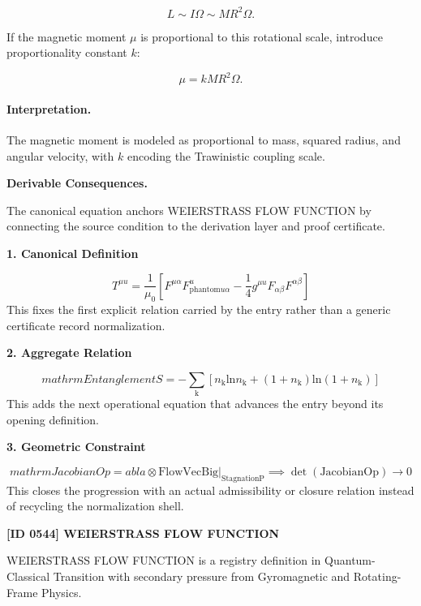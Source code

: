 \begin{equation}
L
\sim
I\Omega
\sim
MR^2\Omega .
\end{equation}

If the magnetic moment $\mu$ is proportional to this rotational scale, introduce proportionality constant $k$:

\begin{equation}
\boxed{
\mu
=
kMR^2\Omega .
}
\end{equation}

\paragraph{Interpretation.}
The magnetic moment is modeled as proportional to mass, squared radius, and angular velocity, with $k$ encoding the Trawinistic coupling scale.

\par\vspace{0.35em}
\noindent\textbf{Derivable Consequences.}\quad
\begingroup
\footnotesize
\raggedright
The canonical equation anchors WEIERSTRASS FLOW FUNCTION by connecting the source condition to the derivation layer and proof certificate.
\par\endgroup

\noindent\textbf{1. Canonical Definition}\par
\[
T^{\mu u} = \frac{1}{\mu_0} \left[ F^{\mu\alpha} F^{ u}_{\mathrm{phantom}{ u}\alpha} - \frac{1}{4} g^{\mu u} F_{\alpha\beta} F^{\alpha\beta} \right]
\]
\noindent This fixes the first explicit relation carried by the entry rather than a generic certificate record normalization.\par
\noindent\textbf{2. Aggregate Relation}\par
\[
mathrm{EntanglementS} = -\sum_{\mathrm{k}} \left[ n_{\mathrm{k}} \mathrm{ln} n_{\mathrm{k}} + (1+n_{\mathrm{k}})\mathrm{ln}(1+n_{\mathrm{k}}) \right]
\]
\noindent This adds the next operational equation that advances the entry beyond its opening definition.\par
\noindent\textbf{3. Geometric Constraint}\par
\[
mathrm{JacobianOp} =  abla \otimes \mathrm{FlowVec} \mathrm{Big}|_{\mathrm{StagnationP}} \implies \det(\mathrm{JacobianOp}) \to 0
\]
\noindent This closes the progression with an actual admissibility or closure relation instead of recycling the normalization shell.\par

\clearpage
\noindent\textbf{[ID 0544] WEIERSTRASS FLOW FUNCTION}\par
\vspace{0.35em}
\begingroup\small
{}
WEIERSTRASS FLOW FUNCTION is a registry definition in Quantum-Classical Transition with secondary pressure from Gyromagnetic and Rotating-Frame Physics.

